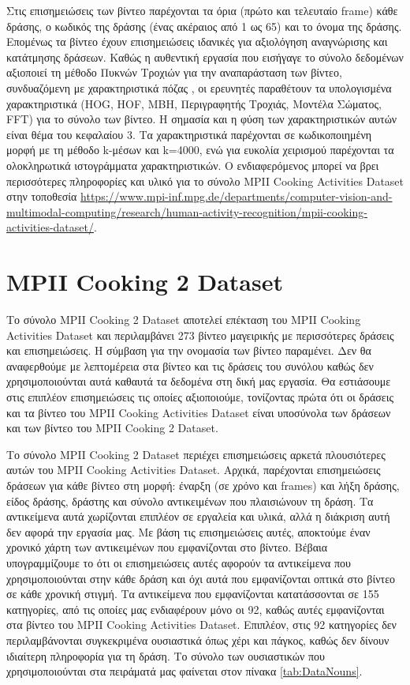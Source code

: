 \par Στις επισημειώσεις των βίντεο παρέχονται τα όρια (πρώτο και τελευταίο frame) κάθε δράσης, ο κωδικός της δράσης (ένας ακέραιος από 1 ως 65) και το όνομα της δράσης. Επομένως τα βίντεο έχουν επισημειώσεις ιδανικές για αξιολόγηση αναγνώρισης και κατάτμησης δράσεων. Καθώς η αυθεντική εργασία \cite{rohrbach_2012} που εισήγαγε το σύνολο δεδομένων αξιοποιεί τη μέθοδο Πυκνών Τροχιών \cite{wang_2011} για την αναπαράσταση των βίντεο, συνδυαζόμενη με χαρακτηριστικά πόζας \cite{andriluka_2009}, οι ερευνητές παραθέτουν τα υπολογισμένα χαρακτηριστικά (HOG, HOF, MBH, Περιγραφητής Τροχιάς, Μοντέλα Σώματος, FFT) για το σύνολο των βίντεο. Η σημασία και η φύση των χαρακτηριστικών αυτών είναι θέμα του κεφαλαίου 3. Τα χαρακτηριστικά παρέχονται σε κωδικοποιημένη μορφή με τη μέθοδο k-μέσων και k=4000, ενώ για ευκολία χειρισμού παρέχονται τα ολοκληρωτικά ιστογράμματα χαρακτηριστικών. Ο ενδιαφερόμενος μπορεί να βρει περισσότερες πληροφορίες και υλικό για το σύνολο MPII Cooking Activities Dataset στην τοποθεσία \url{https://www.mpi-inf.mpg.de/departments/computer-vision-and-multimodal-computing/research/human-activity-recognition/mpii-cooking-activities-dataset/}.


\section{MPII Cooking 2 Dataset \cite{rohrbach_2015}}
Το σύνολο MPII Cooking 2 Dataset αποτελεί επέκταση του MPII Cooking Activities Dataset και περιλαμβάνει 273 βίντεο μαγειρικής με περισσότερες δράσεις και επισημειώσεις. Η σύμβαση για την ονομασία των βίντεο παραμένει. Δεν θα αναφερθούμε με λεπτομέρεια στα βίντεο και τις δράσεις του συνόλου καθώς δεν χρησιμοποιούνται αυτά καθαυτά τα δεδομένα στη δική μας εργασία. Θα εστιάσουμε στις επιπλέον επισημειώσεις τις οποίες αξιοποιούμε, τονίζοντας πρώτα ότι οι δράσεις και τα βίντεο του MPII Cooking Activities Dataset είναι υποσύνολα των δράσεων και των βίντεο του MPII Cooking 2 Dataset.

\par Το σύνολο MPII Cooking 2 Dataset περιέχει επισημειώσεις αρκετά πλουσιότερες αυτών του MPII Cooking Activities Dataset. Αρχικά, παρέχονται επισημειώσεις δράσεων για κάθε βίντεο στη μορφή: έναρξη (σε χρόνο και frames) και λήξη δράσης, είδος δράσης, δράστης και σύνολο αντικειμένων που πλαισιώνουν τη δράση. Τα αντικείμενα αυτά χωρίζονται επιπλέον σε εργαλεία και υλικά, αλλά η διάκριση αυτή δεν αφορά την εργασία μας. Με βάση τις επισημειώσεις αυτές, αποκτούμε έναν χρονικό χάρτη των αντικειμένων που εμφανίζονται στο βίντεο. Βέβαια υπογραμμίζουμε το ότι οι επισημειώσεις αυτές αφορούν τα αντικείμενα που χρησιμοποιούνται στην κάθε δράση και όχι αυτά που εμφανίζονται οπτικά στο βίντεο σε κάθε χρονική στιγμή. Τα αντικείμενα που εμφανίζονται κατατάσσονται σε 155 κατηγορίες, από τις οποίες μας ενδιαφέρουν μόνο οι 92, καθώς αυτές εμφανίζονται στα βίντεο του MPII Cooking Activities Dataset. Επιπλέον, στις 92 κατηγορίες δεν περιλαμβάνονται συγκεκριμένα ουσιαστικά όπως χέρι και πάγκος, καθώς δεν δίνουν ιδιαίτερη πληροφορία για τη δράση. Το σύνολο των ουσιαστικών που χρησιμοποιούνται στα πειράματά μας φαίνεται στον πίνακα \ref{tab:DataNouns}.

